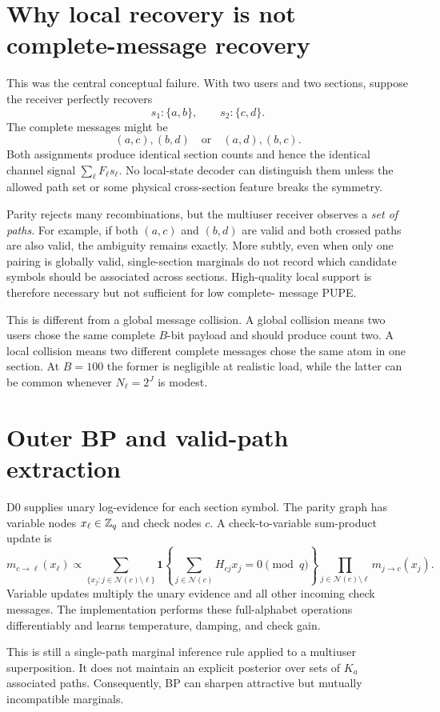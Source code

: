 \documentclass[11pt]{article}
\begin{document}
\section{Why local recovery is not complete-message recovery}

This was the central conceptual failure. With two users and two sections, suppose the receiver perfectly recovers
\[
 s_1:\{a,b\},\qquad s_2:\{c,d\}.
\]
The complete messages might be
\[
 (a,c),(b,d)
 \quad\text{or}\quad
 (a,d),(b,c).
\]
Both assignments produce identical section counts and hence the identical channel signal $\sum_\ell F_\ell s_\ell$.
No local-state decoder can distinguish them unless the allowed path set or some physical cross-section feature breaks
the symmetry.

Parity rejects many recombinations, but the multiuser receiver observes a \emph{set of paths}. For example, if both
$(a,c)$ and $(b,d)$ are valid and both crossed paths are also valid, the ambiguity remains exactly. More subtly, even
when only one pairing is globally valid, single-section marginals do not record which candidate symbols should be
associated across sections. High-quality local support is therefore necessary but not sufficient for low complete-
message PUPE.

This is different from a global message collision. A global collision means two users chose the same complete $B$-bit
payload and should produce count two. A local collision means two different complete messages chose the same atom in
one section. At $B=100$ the former is negligible at realistic load, while the latter can be common whenever
$N_\ell=2^J$ is modest.

\section{Outer BP and valid-path extraction}

D0 supplies unary log-evidence for each section symbol. The parity graph has variable nodes $x_\ell\in\mathbb{Z}_q$ and check
nodes $c$. A check-to-variable sum-product update is
\[
 m_{c\to\ell}(x_\ell)\propto
 \sum_{\{x_j:j\in\mathcal N(c)\setminus\ell\}}
 \mathbf 1\!\left\{\sum_{j\in\mathcal N(c)}H_{cj}x_j=0\pmod q\right\}
 \prod_{j\in\mathcal N(c)\setminus\ell}m_{j\to c}(x_j).
\]
Variable updates multiply the unary evidence and all other incoming check messages. The implementation performs these
full-alphabet operations differentiably and learns temperature, damping, and check gain.

This is still a single-path marginal inference rule applied to a multiuser superposition. It does not maintain an
explicit posterior over sets of $K_a$ associated paths. Consequently, BP can sharpen attractive but mutually
incompatible marginals.
\end{document}
